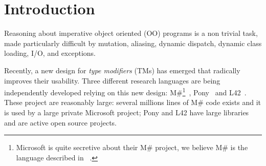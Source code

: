 \section{Introduction}
\saveSpace\saveSpace

Reasoning about imperative object oriented (OO) programs is a non trivial task,
made particularly difficult by mutation, aliasing, dynamic dispatch, dynamic class loading,
I/O, and exceptions.




Recently, a new design for \emph{type modifiers} (TMs) has emerged that radically improves their usability.
Three different research languages are being independently developed relying on this new design: {M\#}\footnote{Microsoft is quite secretive about their M\# project, we believe M\# is the language described in ~\cite{?}.}~\cite{?}, Pony~\cite{?} and L42~\cite{?}.
These project are reasonably large: several millions lines of M\# code exists and it is used by a large private Microsoft project; Pony and L42 have large libraries and are active open source projects.

